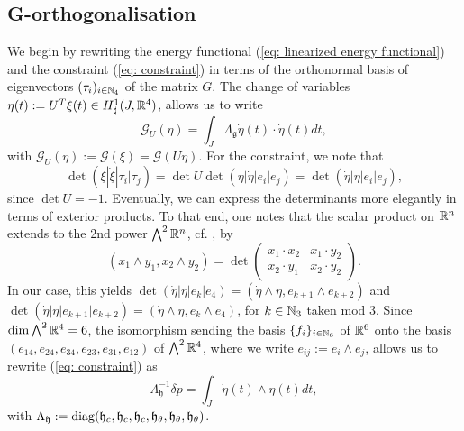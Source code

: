 \subsection{G-orthogonalisation}
We begin by rewriting the energy functional (\ref{eq: linearized energy functional}) and the constraint (\ref{eq: constraint}) in terms of the orthonormal basis of eigenvectors $(\tau_i)_{i \in \mathbb{N}_4}$ of the matrix $G$. The change of variables $\eta(t) := U^T \xi(t) \in H_{\sharp}^{1}(J, \mathbb{R}^4)$, allows us to write
\begin{equation}
\label{eq: G-orth energy functional}
\mathcal{G}_{U}(\eta) = \int_{J} \Lambda_{\mathfrak{g}} \dot{\eta}(t) \cdot \dot{\eta}(t) dt,
\end{equation}
with $\mathcal{G}_{U}(\eta) := \mathcal{G}(\xi) = \mathcal{G}(U \eta)$. For the constraint, we note that
\begin{equation}
\det(\xi |\dot{\xi} | \tau_i | \tau_j) =  \det U \det (\eta | \dot{\eta} | e_i | e_j) = \det(\dot{\eta} | \eta | e_i |e_j),
\end{equation}
since $\det U = -1$. Eventually, we can express the determinants more elegantly in terms of exterior products. To that end, one notes that the scalar product on $\mathbb{R}^n$ extends to the 2nd power $\bigwedge^2 \mathbb{R}^n$, cf. \cite{Lounesto2006}, by
\begin{equation}
(x_1 \wedge y_1, x_2 \wedge y_2) = \det \left (\begin{array}{cc}
x_1 \cdot x_2 & x_1 \cdot y_2 \\ 
x_2 \cdot y_1 & x_2 \cdot y_2
\end{array}  \right ).
\end{equation}
In our case, this yields $\det(\dot{\eta} | \eta | e_k |e_4) = (\dot{\eta} \wedge \eta, e_{k + 1} \wedge e_{k+2})$ and $\det(\dot{\eta} |\eta | e_{k + 1} |e_{k + 2}) = (\dot{\eta} \wedge \eta, e_k \wedge e_4)$, for $k \in \mathbb{N}_3$ taken mod 3. Since $\dim \bigwedge^2 \mathbb{R}^4 = 6$, the isomorphism sending the basis $\{f_i\}_{i \in \mathbb{N}_6}$ of $\mathbb{R}^6$ onto the basis $(e_{14}, e_{24}, e_{34}, e_{23}, e_{31}, e_{12})$ of $\bigwedge^2 \mathbb{R}^4$, where we write $e_{ij} := e_i \wedge e_j$, allows us to rewrite (\ref{eq: constraint}) as
\begin{equation}
\label{eq: G-orth constraint}
\Lambda_{\mathfrak{h}}^{-1} \delta p = \int_{J} \dot{\eta}(t) \wedge\eta(t) dt,
\end{equation}
with $\Lambda_{\mathfrak{h}} := \operatorname{diag}(\mathfrak{h}_{c}, \mathfrak{h}_{c}, \mathfrak{h}_{c}, \mathfrak{h}_{\theta}, \mathfrak{h}_{\theta}, \mathfrak{h}_{\theta})$.

